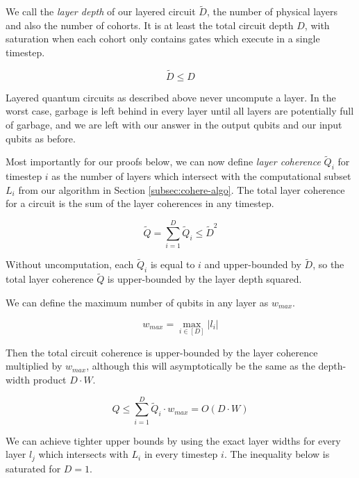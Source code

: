 We call the \emph{layer depth} of our layered circuit $\tilde{D}$, the number
of physical layers and also the number of cohorts.
It is at least the total circuit depth $D$, with saturation when each cohort
only contains gates which execute in a single timestep.

\begin{equation}
\tilde{D} \le D
\end{equation}

Layered quantum circuits as described above never uncompute
a layer. In the worst case, garbage is left behind in every
layer until all layers are potentially full of garbage,
and we are left with our answer in the output qubits and
our input qubits as before.

Most importantly for our proofs below, we can now define
\emph{layer coherence} $\tilde{Q}_i$  for timestep $i$
as the number of layers which intersect with the computational
subset $L_i$ from our algorithm in Section \ref{subsec:cohere-algo}.
The total layer coherence for a circuit is the sum of the
layer coherences in any timestep.

\begin{equation}
\tilde{Q} = \sum_{i=1}^{D} \tilde{Q}_i \le \tilde{D}^2
\end{equation}

Without uncomputation, each $\tilde{Q}_i$ is equal to $i$ and upper-bounded by $\tilde{D}$,
so the total layer coherence $\tilde{Q}$ is upper-bounded by the layer depth squared.

We can define the maximum number of qubits in any layer as $w_{max}$.

\begin{equation}
w_{max} = \max_{i \in [D]} |l_i|
\end{equation}

Then the total circuit coherence is upper-bounded by the layer coherence
multiplied by $w_{max}$, although this will asymptotically be the same as the depth-width product $D\cdot W$.

\begin{equation}
Q \le \sum_{i=1}^{D} \tilde{Q}_i \cdot w_{max} = O(D\cdot W)
\end{equation}

We can achieve tighter upper bounds by using the exact layer widths for every
layer $l_j$ which intersects with $L_i$ in every timestep $i$.
The inequality below is saturated for $D=1$.

